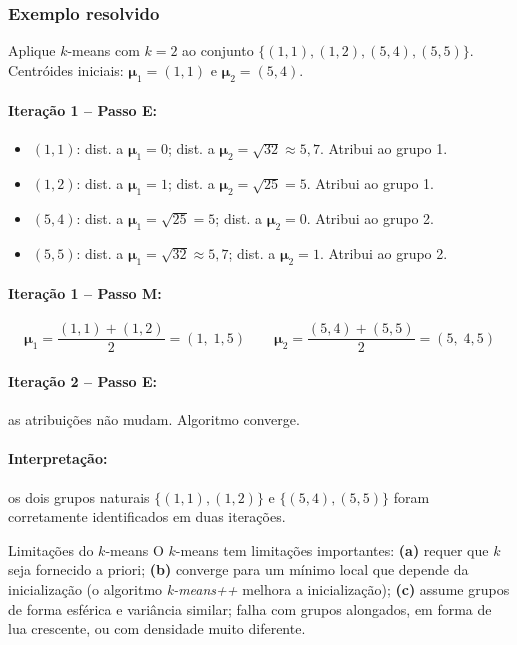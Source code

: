 \documentclass[12pt,a4paper]{article}
\begin{document}
\subsubsection{Exemplo resolvido}

Aplique $k$-means com $k=2$ ao conjunto $\{(1,1), (1,2), (5,4), (5,5)\}$. Centróides iniciais: $\boldsymbol{\mu}_1 = (1,1)$ e $\boldsymbol{\mu}_2 = (5,4)$.

\paragraph{Iteração 1 -- Passo E:}
\begin{itemize}[nosep]
    \item $(1,1)$: dist. a $\boldsymbol{\mu}_1 = 0$; dist. a $\boldsymbol{\mu}_2 = \sqrt{32} \approx 5{,}7$. Atribui ao grupo 1.
    \item $(1,2)$: dist. a $\boldsymbol{\mu}_1 = 1$; dist. a $\boldsymbol{\mu}_2 = \sqrt{25} = 5$. Atribui ao grupo 1.
    \item $(5,4)$: dist. a $\boldsymbol{\mu}_1 = \sqrt{25} = 5$; dist. a $\boldsymbol{\mu}_2 = 0$. Atribui ao grupo 2.
    \item $(5,5)$: dist. a $\boldsymbol{\mu}_1 = \sqrt{32} \approx 5{,}7$; dist. a $\boldsymbol{\mu}_2 = 1$. Atribui ao grupo 2.
\end{itemize}

\paragraph{Iteração 1 -- Passo M:}
\[
\boldsymbol{\mu}_1 = \frac{(1,1) + (1,2)}{2} = (1,\; 1{,}5) \qquad \boldsymbol{\mu}_2 = \frac{(5,4) + (5,5)}{2} = (5,\; 4{,}5)
\]

\paragraph{Iteração 2 -- Passo E:} as atribuições não mudam. Algoritmo converge.

\paragraph{Interpretação:} os dois grupos naturais $\{(1,1),(1,2)\}$ e $\{(5,4),(5,5)\}$ foram corretamente identificados em duas iterações.

\begin{alertabox}{Limitações do $k$-means}
O $k$-means tem limitações importantes: \textbf{(a)} requer que $k$ seja fornecido a priori; \textbf{(b)} converge para um mínimo local que depende da inicialização (o algoritmo \textit{k-means++} melhora a inicialização); \textbf{(c)} assume grupos de forma esférica e variância similar; falha com grupos alongados, em forma de lua crescente, ou com densidade muito diferente.
\end{alertabox}
\end{document}
